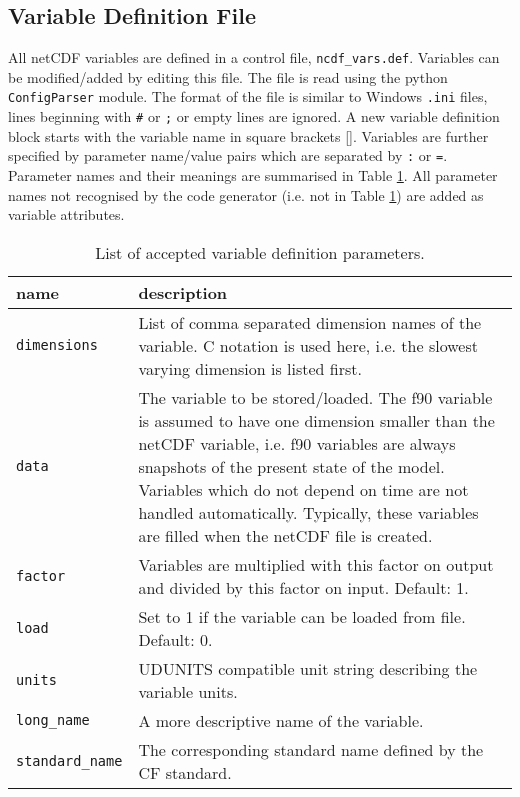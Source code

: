 \subsection{Variable Definition File}\label{dg.sec.vdf}
All netCDF variables are defined in a control file, \texttt{ncdf\_vars.def}. Variables can be modified/added by editing this file. The file is read using the python \texttt{ConfigParser} module. The format of the file is similar to Windows \texttt{.ini} files, lines beginning with \texttt{\#} or \texttt{;} or empty lines are ignored. A new variable definition block starts with the variable name in square brackets []. Variables are further specified by parameter name/value pairs which are separated by \texttt{:} or \texttt{=}. Parameter names and their meanings are summarised in Table \ref{dg.tab.vdf}. All parameter names not recognised by the code generator (i.e. not in Table \ref{dg.tab.vdf}) are added as variable attributes.

\begin{table}[htbp]
 \begin{center}
  \begin{tabular}{|l|p{10cm}|}
    \hline
    name & description \\
    \hline
    \hline
    \texttt{dimensions} & List of comma separated dimension names of the variable. C notation is used here, i.e. the slowest varying dimension is listed first.\\
    \hline
    \texttt{data} & The variable to be stored/loaded. The f90 variable is assumed to have one dimension smaller than the netCDF variable, i.e. f90 variables are always snapshots of the present state of the model. Variables which do not depend on time are not handled automatically. Typically, these variables are filled when the netCDF file is created.\\
    \hline
    \texttt{factor} & Variables are multiplied with this factor on output and divided by this factor on input. Default: 1.\\
    \hline
    \texttt{load} & Set to 1 if the variable can be loaded from file. Default: 0.\\
    \hline
    \texttt{units} & UDUNITS compatible unit string describing the variable units.\\
    \hline
    \texttt{long\_name} & A more descriptive name of the variable.\\
    \hline
    \texttt{standard\_name} & The corresponding standard name defined by the CF standard.\\
    \hline
  \end{tabular}
  \caption{List of accepted variable definition parameters.}
  \label{dg.tab.vdf}
 \end{center}
\end{table}
